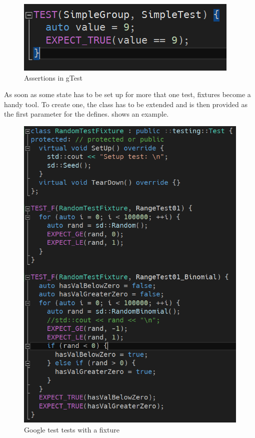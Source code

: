     \begin{figure}[hbtp]
        \centering
        \includegraphics[width=0.6\columnwidth]{img/SimpleTest.PNG}
        \caption{Assertions in gTest}
        \label{fig:gtestSimpleTest}
    \end{figure}

    As soon as some state has to be set up for more that one test, fixtures become a handy tool. 
    To create one, the  class has to be extended and is then provided as the first parameter for the  defines. 
     shows an example.
    
    \begin{figure}[hbtp]
        \centering
        \includegraphics[width=0.8\columnwidth]{img/gtestFixture.PNG}
        \caption{Google test tests with a fixture}
        \label{fig:gtestFixture}
    \end{figure}


